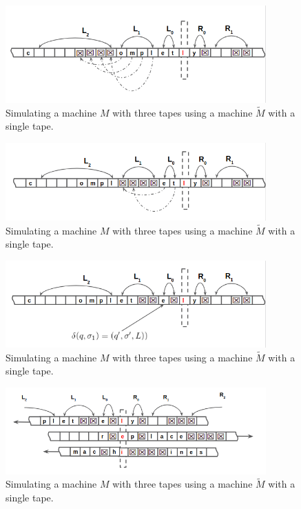 \documentclass[a4paper,12pt]{article}
\begin{document}
\begin{figure}[!ht]
\centering
\includegraphics[width=10cm]{al4.png}
\caption{Simulating a machine $M$ with three tapes using a machine $\widetilde{M}$ with a single tape.}
\label{fig:scetch2}
\end{figure}

\begin{figure}[!ht]
\centering
\includegraphics[width=10cm]{al5.png}
\caption{Simulating a machine $M$ with three tapes using a machine $\widetilde{M}$ with a single tape.}
\label{fig:scetch2}
\end{figure}

\begin{figure}[!ht]
\centering
\includegraphics[width=10cm]{al6.png}
\caption{Simulating a machine $M$ with three tapes using a machine $\widetilde{M}$ with a single tape.}
\label{fig:scetch2}
\end{figure}

\begin{figure}[!ht]
\centering
\includegraphics[width=10cm]{al7.png}
\caption{Simulating a machine $M$ with three tapes using a machine $\widetilde{M}$ with a single tape.}
\label{fig:scetch2}
\end{figure}
\end{document}
